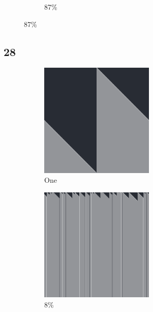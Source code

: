 \documentclass[12pt, fleqn]{report}                             %
\theoremstyle{break}                                            %
\begin{document}
\begin{figure}[ht!]
\begin{subfigure}[b]{0.4\linewidth}
          \caption{87\%}
        \end{subfigure}
      \end{figure}


      \clearpage
      \subsection{28}
      \begin{figure}[ht!]
        \centering
        \begin{subfigure}[b]{0.4\linewidth}
          \includegraphics[width=0.6\textwidth]{Images/28/a.png}
          \caption{One}
        \end{subfigure}
        \begin{subfigure}[b]{0.4\linewidth}
          \includegraphics[width=0.6\textwidth]{Images/28/b.png}
          \caption{8\%}
        \end{subfigure}
        \begin{subfigure}[b]{0.4\linewidth}

\end{subfigure}
\end{figure}
\end{document}
